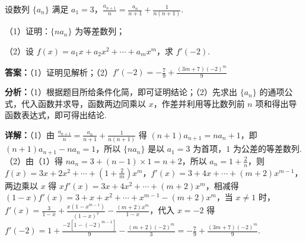 \begin{question}[points=15]
设数列 $\{a_n\}$ 满足 $a_1 = 3$，$\frac{a_{n+1}}{n} = \frac{a_n}{n+1} + \frac{1}{n(n+1)}$.



（1）证明：$\{na_n\}$ 为等差数列；



（2）设 $f(x) = a_1 x + a_2 x^2 + \cdots + a_m x^m$，求 $f'(-2)$.
\begin{solution}
\textbf{答案：}（1）证明见解析；（2）$f'(-2) = -\frac{7}{9} + \frac{(3m+7)(-2)^m}{9}$

\textbf{分析：}（1）根据题目所给条件化简，即可证明结论；（2）先求出 $\{a_n\}$ 的通项公式，代入函数并求导，函数两边同乘以 $x$，作差并利用等比数列前 $n$ 项和得出导函数表达式，即可得出结论.

\textbf{详解：}（1）由 $\frac{a_{n+1}}{n} = \frac{a_n}{n+1} + \frac{1}{n(n+1)}$ 得 $(n+1)a_{n+1} = na_n + 1$，即 $(n+1)a_{n+1} - na_n = 1$，所以 $\{na_n\}$ 是以 $a_1=3$ 为首项，$1$ 为公差的等差数列.
（2）由（1）得 $na_n = 3 + (n-1)\times1 = n+2$，所以 $a_n = 1 + \frac{2}{n}$，则 $f(x) = 3x + 2x^2 + \cdots + \left(1+\frac{2}{m}\right)x^m$，$f'(x) = 3 + 4x + \cdots + (m+2)x^{m-1}$，两边乘以 $x$ 得 $xf'(x) = 3x + 4x^2 + \cdots + (m+2)x^m$，相减得 $(1-x)f'(x) = 3 + x + x^2 + \cdots + x^{m-1} - (m+2)x^m$，当 $x \neq 1$ 时，$f'(x) = \frac{3}{1-x} + \frac{x(1-x^{m-1})}{(1-x)^2} - \frac{(m+2)x^m}{1-x}$，代入 $x = -2$ 得 $f'(-2) = 1 + \frac{-2[1-(-2)^{m-1}]}{9} - \frac{(m+2)(-2)^m}{3} = -\frac{7}{9} + \frac{(3m+7)(-2)^m}{9}$.
\end{solution}
\end{question}

